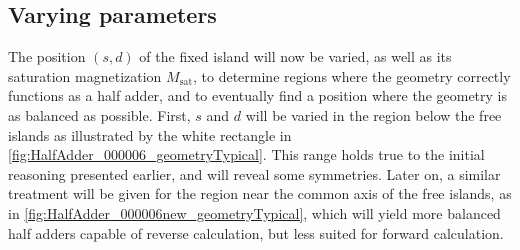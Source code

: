 \documentclass[11pt,a4paper,english,twoside]{article}
\begin{document}
\subsection{Varying parameters} %
The position $(s,d)$ of the fixed island will now be varied, as well as its saturation magnetization $M_\mathrm{sat}$, to determine regions where the geometry correctly functions as a half adder, and to eventually find a position where the geometry is as balanced as possible. First, $s$ and $d$ will be varied in the region below the free islands as illustrated by the white rectangle in \cref{fig:HalfAdder_000006_geometryTypical}. This range holds true to the initial reasoning presented earlier, and will reveal some symmetries. Later on, a similar treatment will be given for the region near the common axis of the free islands, as in \cref{fig:HalfAdder_000006new_geometryTypical}, which will yield more balanced half adders capable of reverse calculation, but less suited for forward calculation.
\end{document}
